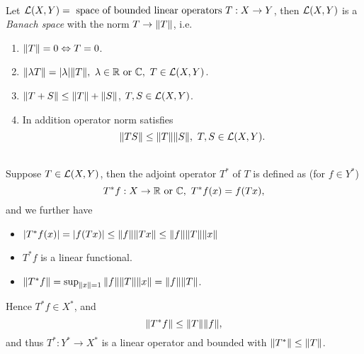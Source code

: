 \vspace{6pt}
\begin{proposition}\ \\
Let $\mathcal{L}(X,Y) = \text{ space of bounded linear operators } T: X \to Y$, then $\mathcal{L}(X,Y)$ is a \textit{Banach space} with the norm $T \to \norm{T}$, i.e.
\begin{enumerate}
    \item $\norm{T} = 0 \Leftrightarrow T = 0$.
    \item $\norm{\lambda T } = \abs{\lambda} \norm{T},\ \lambda \in \mathbb{R} \text{ or } \mathbb{C},\ T \in \mathcal{L}(X,Y)$.
    \item $\norm{T + S} \leq \norm{T} + \norm{S}$, $T,S \in \mathcal{L}(X,Y)$.
    \item In addition operator norm satisfies
    \begin{equation*}
        \norm{TS} \leq \norm{T} \norm{S},\ T,S \in \mathcal{L}(X,Y).
    \end{equation*}
\end{enumerate}
\end{proposition}

\vspace{6pt}
\begin{definition}\ \\
Suppose $T \in \mathcal{L}(X,Y)$, then the adjoint operator $T^*$ of $T$ is defined as (for $f \in Y^*$)
\begin{equation*}
    T^* f : X \to \mathbb{R} \text{ or } \mathbb{C},\ T^*f(x) = f(Tx),
\end{equation*}
and we further have
\begin{itemize}
    \item $\abs{T^* f(x)} = \abs{f(Tx)} \leq \norm{f} \norm{Tx} \leq \norm{f} \norm{T} \norm{x}$
    \item $T^* f$ is a linear functional.
    \item $\norm{T^* f} = \sup_{\norm{x} = 1} \norm{f}\norm{T}\norm{x} = \norm{f} \norm{T}$.
\end{itemize}
Hence $T^* f \in X^*$, and 
\begin{equation*}
    \norm{T^* f} \leq \norm{T}\norm{f},
\end{equation*}
and thus $T^*: Y^* \to X^*$ is a linear operator and bounded with $\norm{T^*} \leq \norm{T}$.
\end{definition}



